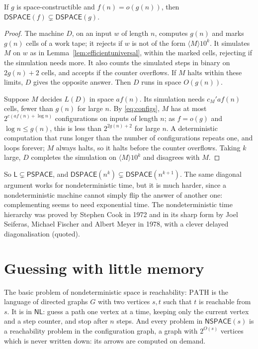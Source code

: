 \begin{theorem}\label{thm:spacehierarchy}
If $g$ is space-constructible and $f(n)=o(g(n))$, then $\mathsf{DSPACE}(f)\subsetneq\mathsf{DSPACE}(g)$.
\end{theorem}

\begin{proof}
The machine $D$, on an input $w$ of length $n$, computes $g(n)$ and marks $g(n)$ cells of a work tape; it rejects if $w$ is not of the form $\langle M\rangle10^k$. It simulates $M$ on $w$ as in Lemma~\ref{lem:efficientuniversal}, within the marked cells, rejecting if the simulation needs more. It also counts the simulated steps in binary on $2g(n)+2$ cells, and accepts if the counter overflows. If $M$ halts within these limits, $D$ gives the opposite answer. Then $D$ runs in space $O(g(n))$.

Suppose $M$ decides $L(D)$ in space $af(n)$. Its simulation needs $c_M'af(n)$ cells, fewer than $g(n)$ for large $n$. By \eqref{eq:configs}, $M$ has at most $2^{c(af(n)+\log n)}$ configurations on inputs of length $n$; as $f=o(g)$ and $\log n\le g(n)$, this is less than $2^{2g(n)+2}$ for large $n$. A deterministic computation that runs longer than the number of configurations repeats one, and loops forever; $M$ always halts, so it halts before the counter overflows. Taking $k$ large, $D$ completes the simulation on $\langle M\rangle10^k$ and disagrees with $M$.
\end{proof}

So $\mathsf L\subsetneq\mathsf{PSPACE}$, and $\mathsf{DSPACE}(n^k)\subsetneq\mathsf{DSPACE}(n^{k+1})$. The same diagonal argument works for nondeterministic time, but it is much harder, since a nondeterministic machine cannot simply flip the answer of another one: complementing seems to need exponential time. The nondeterministic time hierarchy was proved by Stephen Cook in 1972 and in its sharp form by Joel Seiferas, Michael Fischer and Albert Meyer in 1978, with a clever delayed diagonalisation (quoted).

\section{Guessing with little memory}\label{sec:savitch}

The basic problem of nondeterministic space is reachability: $\mathrm{PATH}$ is the language of directed graphs $G$ with two vertices $s,t$ such that $t$ is reachable from $s$. It is in $\mathsf{NL}$: guess a path one vertex at a time, keeping only the current vertex and a step counter, and stop after $n$ steps. And every problem in $\mathsf{NSPACE}(s)$ is a reachability problem in the configuration graph, a graph with $2^{O(s)}$ vertices which is never written down: its arrows are computed on demand.

